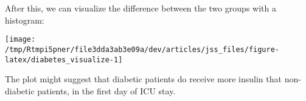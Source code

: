 \documentclass[
]{jss}
\begin{document}
After this, we can visualize the difference between the two groups with
a histogram:

\begin{CodeChunk}


\begin{center}\texttt{[image: /tmp/Rtmpi5pner/file3dda3ab3e09a/dev/articles/jss\_files/figure-latex/diabetes\_visualize-1]} \end{center}

\end{CodeChunk}

The plot might suggest that diabetic patients do receive more insulin
that non-diabetic patients, in the first day of ICU stay.


\end{document}

